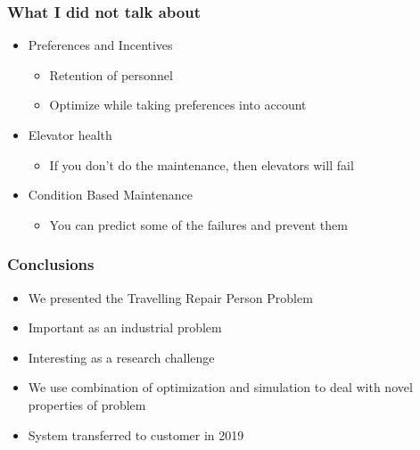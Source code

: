 \begin{frame}
\frametitle{What I did not talk about}
\begin{itemize}
\item Preferences and Incentives
\begin{itemize}
\item Retention of personnel
\item Optimize while taking preferences into account
\end{itemize}
\item Elevator health
\begin{itemize}
\item If you don't do the maintenance, then elevators will fail
\end{itemize}
\item Condition Based Maintenance
\begin{itemize}
\item You can predict some of the failures and prevent them
\end{itemize}
\end{itemize}
\end{frame}


\begin{frame}
\frametitle{Conclusions}
\begin{itemize}
\item We presented the Travelling Repair Person Problem
\item Important as an industrial problem
\item Interesting as a research challenge
\item We use combination of optimization and simulation to deal with novel properties of problem
\item System transferred to customer in 2019
\end{itemize}
\end{frame}
